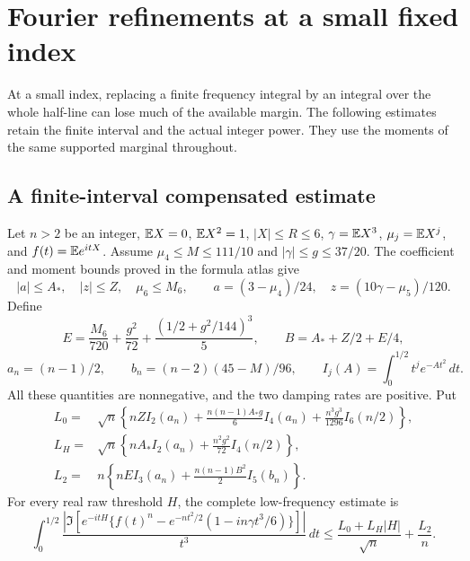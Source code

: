 \section{Fourier refinements at a small fixed index}
\label{ext:small-fourier}
At a small index, replacing a finite frequency integral by an integral
over the whole half-line can lose much of the available margin. The
following estimates retain the finite interval and the actual integer
power. They use the moments of the same supported marginal throughout.

\subsection{A finite-interval compensated estimate}
Let $n>2$ be an integer, $\mathbb E X=0$, $\mathbb E X^2=1$, $|X|\le R\le6$,
$\gamma=\mathbb E X^3$, $\mu_j=\mathbb E X^j$, and $f(t)=\mathbb E e^{itX}$.
Assume $\mu_4\le M\le111/10$ and $|\gamma|\le g\le37/20$.
The coefficient and moment bounds proved in the formula atlas give
\[
 |a|\le A_*,\quad |z|\le Z,\quad \mu_6\le M_6,
 \qquad a=(3-\mu_4)/24,\quad z=(10\gamma-\mu_5)/120.
\]
Define
\[
 E=\frac{M_6}{720}+\frac{g^2}{72}
       +\frac{(1/2+g^2/144)^3}{5},\qquad
 B=A_*+Z/2+E/4,
\]
\[
 a_n=(n-1)/2,\qquad b_n=(n-2)(45-M)/96,\qquad
 I_j(A)=\int_0^{1/2}t^j e^{-At^2}\,dt.
\]
All these quantities are nonnegative, and the two damping rates are
positive. Put
\begin{align*}
 L_0={}&\sqrt n\left\{nZI_2(a_n)
       +\frac{n(n-1)A_*g}{6}I_4(a_n)
       +\frac{n^3g^3}{1296}I_6(n/2)\right\},\\
 L_H={}&\sqrt n\left\{nA_*I_2(a_n)
                              +\frac{n^2g^2}{72}I_4(n/2)\right\},\\
 L_2={}&n\left\{nEI_3(a_n)+\frac{n(n-1)B^2}{2}I_5(b_n)\right\}.
\end{align*}
For every real raw threshold $H$, the complete low-frequency estimate is
\begin{equation}\label{ext:finite-low}
 \int_0^{1/2}\frac{\left|\Im\left[e^{-itH}
 \{f(t)^n-e^{-nt^2/2}(1-in\gamma t^3/6)\}\right]\right|}{t^3}\,dt
 \le\frac{L_0+L_H|H|}{\sqrt n}+\frac{L_2}{n}.
\end{equation}


